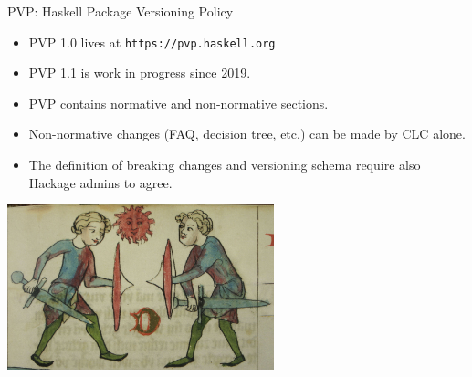 \documentclass[handout]{beamer}
\begin{document}
\begin{frame}{PVP: Haskell Package Versioning Policy}

\begin{itemize}[<+->]

\item PVP 1.0 lives at {\tt https://pvp.haskell.org}
\item PVP 1.1 is work in progress since 2019.
\item PVP contains normative and non-normative sections.
\item Non-normative changes (FAQ, decision tree, etc.) can be made by CLC alone.
\item The definition of breaking changes and versioning schema require also Hackage admins to agree.

\end{itemize}

\medskip

\centerline{\includegraphics[width=0.58\textwidth]{pvp.jpg}}

\end{frame}
\end{document}
